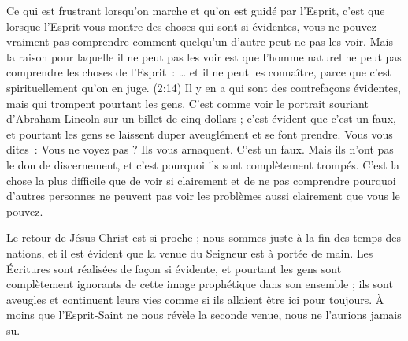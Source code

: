 Ce qui est frustrant lorsqu'on marche et qu'on est guidé par l'Esprit,
 c'est que lorsque l'Esprit vous montre des choses qui sont si évidentes,
 vous ne pouvez vraiment pas comprendre comment quelqu'un d'autre
 peut ne pas les voir. Mais la raison pour laquelle il ne peut pas les voir
 est que l'homme naturel ne peut pas comprendre les choses de l'Esprit~:
 \og \dots{} et il ne peut les connaître, parce que c'est spirituellement
 qu'on en juge. \fg{} (2:14)
 Il y en a qui sont des contrefaçons évidentes, mais qui trompent pourtant
 les gens. C'est comme voir le portrait souriant d'Abraham Lincoln
 sur un billet de cinq dollars ; c'est évident que c'est un faux,
 et pourtant les gens se laissent duper aveuglément et se font prendre.
 Vous vous dites~: \og Vous ne voyez pas ? Ils vous arnaquent.
 C'est un faux. \fg{}
 Mais ils n'ont pas le don de discernement, et c'est pourquoi ils sont
 complètement trompés.
 C'est la chose la plus difficile que de voir si clairement et de ne pas
 comprendre pourquoi d'autres personnes ne peuvent pas voir les problèmes
 aussi clairement que vous le pouvez.

Le retour de Jésus-Christ est si proche ; nous sommes juste à la fin
 des temps des nations, et il est évident que la venue du Seigneur
 est à portée de main. Les Écritures sont réalisées de façon si évidente,
 et pourtant les gens sont complètement ignorants de cette image prophétique
 dans son ensemble ; ils sont aveugles et continuent leurs vies
 comme si ils allaient être ici pour toujours.
 À moins que l'Esprit-Saint ne nous révèle la seconde venue,
 nous ne l'aurions jamais su.




